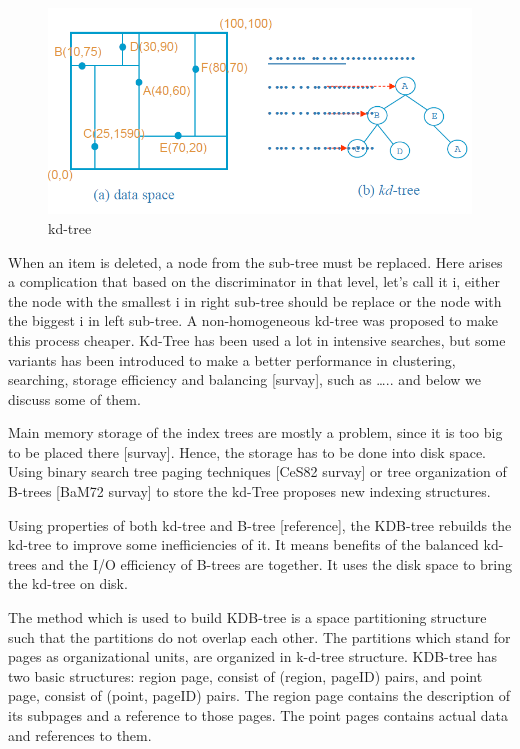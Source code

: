 \documentclass[a4paper,12pt]{article}
\begin{document}
\begin{figure}
\centering
\includegraphics[width=\textwidth]{kdtree}
\caption{kd-tree}
\label{fig1}
\end{figure}


When an item is deleted, a node from the sub-tree must be replaced. Here arises a complication that based on the discriminator in that level, let's call it i, either the node with the smallest i in right sub-tree should be replace or  the node with the biggest i in left sub-tree. A non-homogeneous kd-tree was proposed to make this process cheaper. 
Kd-Tree has been used a lot in intensive searches, but some variants has been introduced to make a better performance in clustering, searching, storage efficiency and balancing [survay], such as …..
and below we discuss some of them.

Main memory storage of the index trees are mostly a problem, since it is too big to be placed there  [survay]. Hence, the storage has to be done into disk space. Using binary search tree paging techniques [CeS82 survay] or tree organization of B-trees [BaM72 survay] to store the kd-Tree proposes new indexing structures.

Using properties of both kd-tree and B-tree [reference], the KDB-tree rebuilds the kd-tree to improve some inefficiencies of it.  It means benefits of the balanced kd-trees and the I/O efficiency of B-trees are together. It uses the disk space to bring the kd-tree on disk. 

The method which is used to build  KDB-tree is a space partitioning structure such that the partitions do not overlap each other. The partitions which stand for pages as organizational units, are organized in k-d-tree structure. 
KDB-tree has two basic structures: region page, consist of (region, pageID) pairs, and point page, consist of  (point, pageID) pairs. The region page contains the description of its subpages and a reference to those pages. The point pages contains actual data and references to them. 
\end{document}
